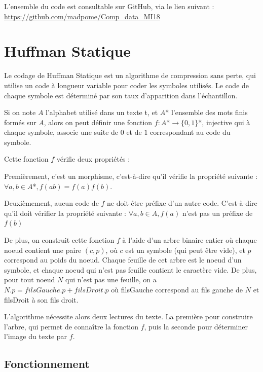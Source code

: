 \documentclass{article}
\begin{document}
L'ensemble du code est consultable sur GitHub, via le lien suivant : 
\url{https://github.com/madpome/Comp_data_MI18}


\section{Huffman Statique}



Le codage de Huffman Statique est un algorithme de compression sans perte, qui utilise un code \`{a} longueur variable pour coder les symboles utilis\'{e}s. Le code de chaque symbole est d\'{e}termin\'{e} par son taux d'apparition dans l'\'{e}chantillon. 

Si on note $A$ l'alphabet utilis\'{e} dans un texte t, et $A$* l'ensemble des mots finis form\'{e}s sur $A$, alors on peut d\'{e}finir une fonction $f : A$*$ \rightarrow \{0,1\}$*, injective qui \`{a} chaque symbole, associe une suite de $0$ et de $1$ correspondant au code du symbole.

Cette fonction $f$ v\'{e}rifie deux propri\'{e}t\'{e}s : 

Premi\`{e}rement, c'est un morphisme, c'est-\`{a}-dire qu'il v\'{e}rifie la propri\'{e}t\'{e} suivante : $\forall a,b \in A$*$, f(ab) = f(a)f(b)$. 

Deuxi\`{e}mement, aucun code de $f$ ne doit \^{e}tre pr\'{e}fixe d'un autre code. C'est-\`{a}-dire qu'il doit v\'{e}rifier la propri\'{e}t\'{e} suivante : $\forall a,b \in A, f(a)$ n'est pas un pr\'{e}fixe de $f(b)$

De plus, on construit cette fonction $f$ \`{a} l'aide d'un arbre binaire entier o\`{u} chaque noeud contient une paire $(c, p)$, o\`{u} $c$ est un symbole (qui peut \^{e}tre vide), et $p$ correspond au poids du noeud. Chaque feuille de cet arbre est le noeud d'un symbole, et chaque noeud qui n'est pas feuille contient le caract\`{e}re vide. De plus, pour tout noeud $N$ qui n'est pas une feuille, on a $N.p = filsGauche.p + filsDroit.p$ o\`{u} filsGauche correspond au fils gauche de $N$ et filsDroit \`{a} son fils droit.

L'algorithme n\'{e}cessite alors deux lectures du texte. La premi\`ere pour construire l'arbre, qui permet de conna\^{i}tre la fonction $f$, puis la seconde pour d\'{e}terminer l'image du texte par $f$.

\subsection{Fonctionnement}
\end{document}
